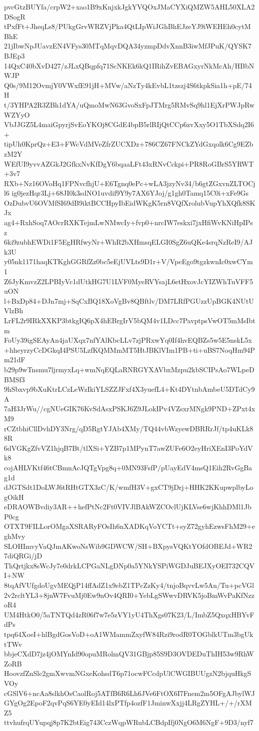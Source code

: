 pvcGtzBUYfa/crpW2+xao1B9xKnjxkJgkYVQOxJMaCYXiQMZW5AHL50XLA2DSogR
tPxfFt+JheqLs8/PUkgGrvWRZVjPka4QtLIpWiJGhBhEJzeYJ9iWEHEh0cytMBhE
21jIbwNpJUavzEN4VFys30MTqMqvDQA34yzmpDdvXnnB3iwMfJPuK/QYSK7BJEp3
14QxC40bXvD427/zJLxQBqpfq71ScNKEk6kQ1IRihZvEBAGxyrNkMcAh/HBbNWJP
Q0s/9M12OvmjY0VWxfE91jH+MVw/aNzTy4kEvbL1tzszj4S6tkpkSia1h+pE/74H
t/3YHPA2R3ZBh1dYA/uQmoMwN63GvoSxFpJTMrg5RMvSq9hl1EjXrPWJpRwWZYyO
VbJJGZ5L4maiGpyrjSvEoYKOj8CGdE4bpB5rlRIjQtCCp6zvXxy5O1TbXSdq2I6+
tipUh0KprQz+E3+FWcVdMVeZfrZUCXDz+786CZ67FNCkZYdGxqolk6Cg9EZbzM2Y
WEfUI9yvvAZGkJ2GfkxNvKfDgY6bqaaLFt43xRNvCckpi+PR8RoGBrS5YRWT+3v7
RXb+Nz16OVoHq1FPNvcfhjU+E6Tgnq0ePc+wLA3jzyNv34/b6gtZGxvnZLTOCjl6
ig0jezHqr3Lj+68JI0k3sdNO1uvdif9Y9y7AX6YJoj/g1gh0Tamq15C0i+xFe9Gs
OzDubvU6OVMfSI69dB9iktBCCHpyIbEidWKgK5rn8VQfXrolubVupYhXQfk8SKJx
ag4+RxhSoq7AOcrRXKTejmLwNMwcIy+fvp0+nrcIW7eskxi7jxHfiWvKNiHpIPsz
6ki9zubhEWDi1F5EgHRfwyNr+WhR2bXHmsqELGI0SgZ6uQKe4srqNzReI9/AJk3U
y05nk1171haqKTKghGGRfZz0bc5eEjUVLts9D1r+V/VpeEgo9tgzkwnIc0xwCYm1
Z6JyKmvzZ2LPBIyVc1dUtkHG7U1LVF0MyeRVYsajL6etHxovJcYIZWhTuVFF5uON
l+BxDp84+DJn7mj+SqCxBQ18XoVgBv8QBftlv/DM7LRfPGUzzUpBGK4NUtUVlzBh
LrFL2r9IRkXXKP3btkgIQ6pX4hEBrgIrV5bQM4v1LDcc7PavptpsVwOT5mMsIbtm
FoUy39igSEAyAn4jaUXqx7nfYAlKbcLLv7zjPRxwYq0If4hvEQBZs5w5E5nskL5x
+hheyrzyCcDGkqI4PSU5LzfKQMMmMT5HtJBKlVIm1PB+ti+uBS7NoqHm94Pm21dF
b29p9wTnsmu7ljrmyxLq+wmNqEQLaRNRGYXAVbxMzpu2kbSCIPsAo7WLpeDBMSf3
9hSbxvp9bXuKtrLCzLeWzIkiYLSZZJFxf4X3yuefL4+Kt4DYtnbAmbeU5DTdCy9A
7aH3JrWu//cgNUeGIK76KvSdAsxPSKJ6Z9JLokIPv4VZsxrMNgk9PND+ZPxt4xM9
rCZtbhiCllDvhDY3Nrg/qD5RgtYJAb4XMy/TQ44vbWzyewDBRRrJf/tp4uKLk88R
6dVGKgZfvVZ1hjqB7Bt/tlXSi+YZB7p1MPynT7awZUFe6O2eyHriXEnI3PoYdVk8
cojAHLVKtf46tCBmnAcJQTgVpg8q+0MN93FsfP/pUayEdV4msQ1Eih2RvGgBag1d
dJGTSdt1DoLWJ6tRHtGTX3zC/K/wmfH3V+gxCT9jDrj+HHK2KKupwplbyLogOikH
eDRAOWBvdiy3AR++hefPtNc2Ft0VIVJlBAkWZCOclUjKLVse6wjKhhDMl1JbP0cg
OTXT9FILLorOMgaXSRARyFOsIh6nXADKqVoYCTt+syZ72gyhEzwsFhM29+eghMvy
SLOHImvyVaQJmAKwoNsWib9GDWCW/SH+BXpysVQKtYOfdOBEJd+WR27diQRGi/jD
ThQrtjkx8sWcJy7e0drkLCPGaNLgDNp0a5YNkYSPiWGDJuBEJXyOEI732CQVI+NW
8tqAfVUfgdoUgvMEQjP14ffAdZ1x9ebZ1TPcZzKy4/tnjoBqvvLw5An/Tu+pcVGl
2v2rcltYL3+8jnW7FvuMj0Ew9nOv4QRI0+YebLgSWwvDRVK5joBmWvPaKfNzzoR4
UM4HtkO0/5aTNTQd4zR06f7w7e5zVY1yU4ThXgs07K23/L/ImbZ5QxqxHBYvFdPs
tpq64XoeI+hlBgdGosVoD+oA1WMammZxyfW84Rzi9rodR0TOGblkUTm3bgUktTWv
bbjeCXdD7jz4jOMYnId90opuMRolmQV31GBjp85S9D3OVDEDuThIH53w9RhWZoRB
HoovzfZnSlc2gmXwvmNGxeKohsdT6p71ocwFCcdpUlCWGIBUUgzN2bjquHkgSVOy
cGSlV6+ncAa8slkhOsCaolRoj5ATfB6R6Lh6JVe6FtOX6I7Fnem2m5OFgAJbylWJ
GYgOg2EpoF2qvPqS6YE0yEId14lxPTfp4ozfF1JminwXxjj4LRgZYHL+/+/rXMZ5
ttvhufrqUYupqj8p7K2btEig743CczWqpWRubLCBdpIfj0NgO6M6NgF+9D3/nyf7
